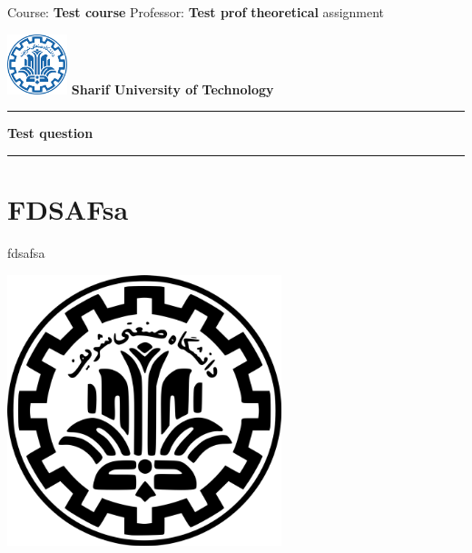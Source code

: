 \documentclass{article}%
\begin{document}
%
\normalsize%
\begin{minipage}{0.6\linewidth}%
\begin{flushleft}%
\large{Course: \textbf{Test course}}%
\vspace{0.1cm}%
\newline%
\vspace{0.1cm}%
\normalsize{Professor: \textbf{Test prof}}%
\newline%
\vspace{0.1cm}%
\normalsize{\textbf{theoretical} assignment}%
\end{flushleft}%
\end{minipage}%
\begin{minipage}{0.36\linewidth}%
\begin{flushright}%
\includegraphics[width=1.75cm]{logo.png}%
\hfill%
\newline%
\hfill%
\textbf{\normalsize{Sharif University of Technology}}%
\end{flushright}%
\end{minipage}%
\begin{center}%
\hrule height 0.02cm%
\vspace{0.2cm}%
\large{\textbf{Test question}}%
\vspace{0.2cm}%
\hrule height 0.02cm%
\end{center}%
\section{\textbf{FDSAFsa}}%
\label{sec:textbfFDSAFsa}%
fdsafsa%
\begin{center}%
\includegraphics[width=8cm]{./questionattachments/logo.png}%
\end{center}

%
\end{document}
